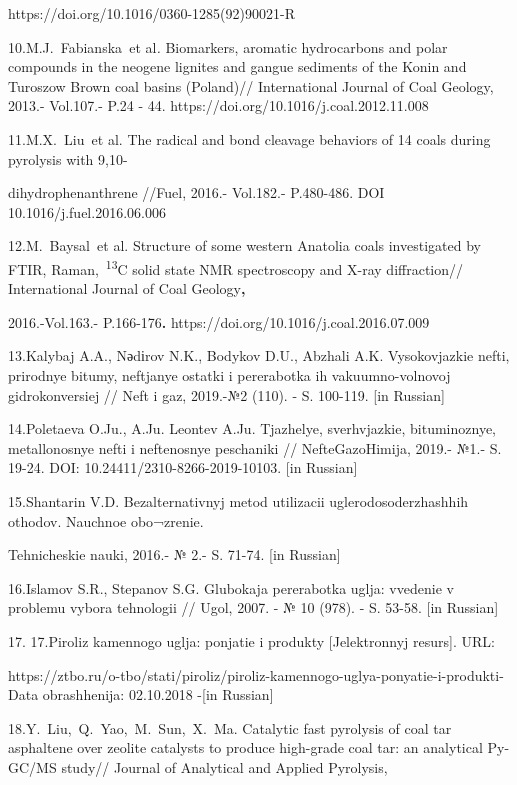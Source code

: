 \begin{noparindent}
https://doi.org/10.1016/0360-1285(92)90021-R

10.M.J.~Fabianska\emph{~}et al\emph{.} Biomarkers, aromatic hydrocarbons
and polar compounds in the neogene lignites and gangue sediments of the
Konin and Turoszow Brown coal basins (Poland)// International Journal of
Coal Geology, 2013.- Vol.107.- P.24 - 44.
https://doi.org/10.1016/j.coal.2012.11.008

11.M.X.~Liu\emph{~}et al. The radical and bond cleavage behaviors of 14
coals during pyrolysis with 9,10-

dihydrophenanthrene //Fuel, 2016.-
Vol.182.- P.480-486. DOI 10.1016/j.fuel.2016.06.006

12.M.~Baysal\emph{~}et al. Structure of some western Anatolia coals
investigated by FTIR, Raman,~\textsuperscript{13}C solid state NMR
spectroscopy and X-ray diffraction// International Journal of Coal
Geology{\bfseries ,}

2016.-Vol.163.- P.166-176{\bfseries .}
https://doi.org/10.1016/j.coal.2016.07.009

13.Kalybaj A.A., Nәdіrov N.K., Bodykov D.U., Abzhali A.K. Vysokovjazkie
nefti, prirodnye bitumy, neftjanye ostatki i pererabotka ih
vakuumno-volnovoj gidrokonversiej // Neft\textquotesingle{} i gaz,
2019.-№2 (110). - S. 100-119. {[}in Russian{]}

14.Poletaeva O.Ju., A.Ju. Leont\textquotesingle ev A.Ju. Tjazhelye,
sverhvjazkie, bituminoznye, metallonosnye nefti i neftenosnye peschaniki
// NefteGazoHimija, 2019.- №1.- S. 19-24. DOI:
10.24411/2310-8266-2019-10103. {[}in Russian{]}

15.Shantarin V.D. Bezal\textquotesingle ternativnyj metod utilizacii
uglerodosoderzhashhih othodov. Nauchnoe obo¬zrenie.

Tehnicheskie nauki,
2016.- № 2.- S. 71-74. {[}in Russian{]}

16.Islamov S.R., Stepanov S.G. Glubokaja pererabotka uglja: vvedenie v
problemu vybora tehnologii // Ugol\textquotesingle, 2007. - № 10 (978).
- S. 53-58. {[}in Russian{]}

17. 17.Piroliz kamennogo uglja: ponjatie i produkty {[}Jelektronnyj
resurs{]}. URL:

https://ztbo.ru/o-tbo/stati/piroliz/piroliz-kamennogo-uglya-ponyatie-i-produkti-Data
obrashhenija: 02.10.2018 -{[}in Russian{]}

18.Y.~Liu,~Q.~Yao,~M.~Sun,~X.~Ma. Catalytic fast pyrolysis of coal tar
asphaltene over zeolite catalysts to produce high-grade coal tar: an
analytical Py-GC/MS study// Journal of Analytical and Applied Pyrolysis,


\end{noparindent}

